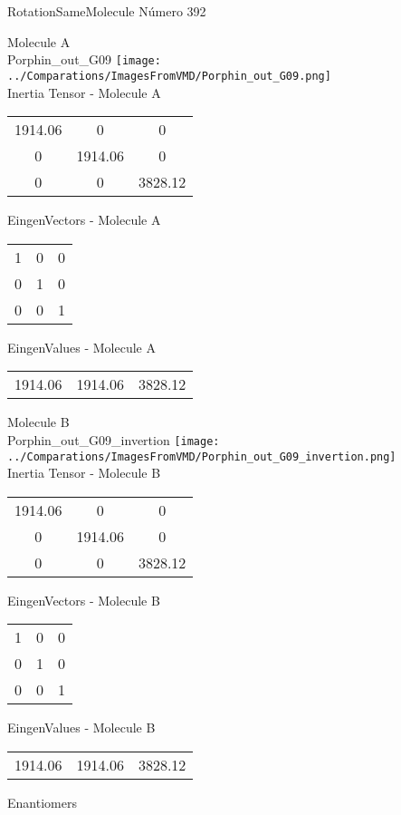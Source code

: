  \newpage

\vtab[-2cm]
\begin{center}
{\large RotationSameMolecule \tab Número 392}
\end{center}
\begin{multicols}{2}
\begin{center}

Molecule A \\ 
Porphin\_out\_G09
\texttt{[image: ../Comparations/ImagesFromVMD/Porphin\_out\_G09.png]}
\\
Inertia Tensor - Molecule A \\
\vtab

\begin{tabular}{|c c c|}
1914.06	 & 	0	 & 	0	 \\
0	 & 	1914.06	 & 	0	 \\
0	 & 	0	 & 	3828.12
\end{tabular}

\vtab
 EingenVectors - Molecule A     \\
\vtab
\begin{tabular}{|c c c|}
1	 & 	0	 & 	0	 \\
0	 & 	1	 & 	0	 \\
0	 & 	0	 & 	1
\end{tabular}

\vtab
 EingenValues - Molecule A     \\
\vtab
\begin{tabular}{|c c c|}
1914.06	 & 	1914.06	 & 	3828.12	 \\
\end{tabular}
\columnbreak

Molecule B \\ 
Porphin\_out\_G09\_invertion
\texttt{[image: ../Comparations/ImagesFromVMD/Porphin\_out\_G09\_invertion.png]}
\\
Inertia Tensor - Molecule B \\
\vtab

\begin{tabular}{|c c c|}
1914.06	 & 	0	 & 	0	 \\
0	 & 	1914.06	 & 	0	 \\
0	 & 	0	 & 	3828.12
\end{tabular}

\vtab
 EingenVectors - Molecule B     \\
\vtab
\begin{tabular}{|c c c|}
1	 & 	0	 & 	0	 \\
0	 & 	1	 & 	0	 \\
0	 & 	0	 & 	1
\end{tabular}

\vtab
 EingenValues - Molecule B     \\
\vtab
\begin{tabular}{|c c c|}
1914.06	 & 	1914.06	 & 	3828.12	 \\
\end{tabular}

\end{center}
\end{multicols}
\begin{center}
\vtab
\vtab
\textcolor{NavyBlue}{\Large Enantiomers}
\end{center}

